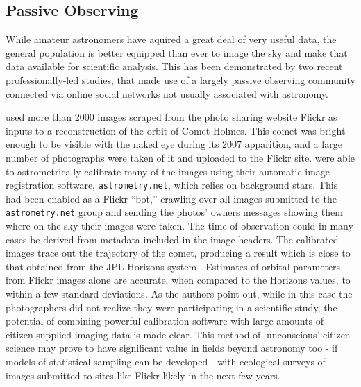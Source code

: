 \documentclass{ar2e}
\begin{document}

 

\subsection{Passive Observing}
\label{sec:obs:passive}

While amateur astronomers have aquired a great deal of very useful data, the
general population is better equipped than ever to image the sky and make that
data available for scientific analysis. This has been demonstrated by two
recent professionally-led studies, that made use of a largely passive
observing community connected via online social networks not usually
associated with astronomy. 

\citet{Lang++2011} used more than 2000 images scraped from the photo sharing website Flickr
as inputs to a reconstruction of the orbit of Comet Holmes. This comet was
bright enough to be visible with the naked eye during its 2007 apparition, and a large number
of photographs were taken of it and uploaded to the Flickr site.
\citeauthor{Lang++2011} were able to astrometrically calibrate many of the images using their automatic
image registration software, \texttt{astrometry.net}, which relies on background stars. This had been enabled as
a Flickr ``bot,'' crawling over all images submitted to the
\texttt{astrometry.net} group and sending the photos' owners messages showing
them where on the sky their images were taken.  The time of observation could in many cases be derived from metadata included in the image headers. The calibrated images trace out
the trajectory of the comet, producing a result which is close to that obtained from the JPL Horizons system \citep{Giorgini}. Estimates of orbital parameters from Flickr images alone are accurate, when compared to the Horizons values, to within a few standard deviations. As the authors point out, while in this case the
photographers did not realize they were participating in a scientific study,
the potential of combining powerful calibration software with large amounts of
citizen-supplied imaging data is made clear. This method of `unconscious' citizen science may prove to have significant value in fields beyond astronomy too - if models of statistical sampling can be developed - with ecological surveys of images submitted to sites like Flickr likely in the next few years. 
\end{document}
